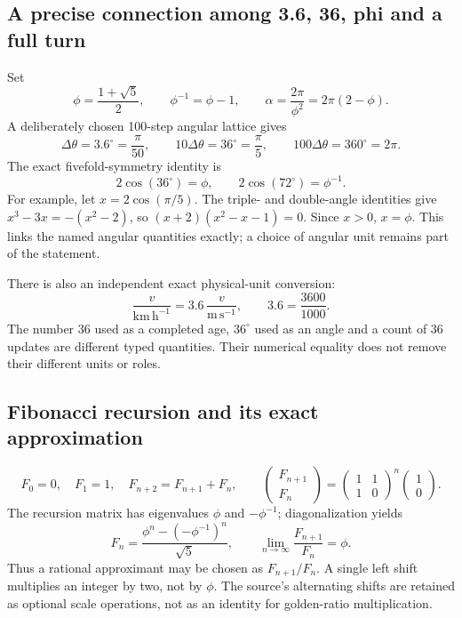 \documentclass[11pt,a4paper]{article}
\numberwithin{equation}{section}
\begin{document}
\subsection{A precise connection among 3.6, 36, phi and a full turn}
Set
\begin{equation}
\phi=\frac{1+\sqrt5}{2},\qquad \phi^{-1}=\phi-1,\qquad
\alpha=\frac{2\pi}{\phi^2}=2\pi(2-\phi).
\label{eq:phi}
\end{equation}
A deliberately chosen 100-step angular lattice gives
\begin{equation}
\Delta\theta=3.6^\circ=\frac{\pi}{50},\qquad
10\Delta\theta=36^\circ=\frac{\pi}{5},\qquad
100\Delta\theta=360^\circ=2\pi.
\end{equation}
The exact fivefold-symmetry identity is
\begin{equation}
2\cos(36^\circ)=\phi,\qquad 2\cos(72^\circ)=\phi^{-1}.
\end{equation}
For example, let $x=2\cos(\pi/5)$. The triple- and double-angle identities give
$x^3-3x=-(x^2-2)$, so $(x+2)(x^2-x-1)=0$. Since $x>0$, $x=\phi$. This links the named angular quantities exactly; a choice of angular unit remains part of the statement.

There is also an independent exact physical-unit conversion:
\begin{equation}
\frac{v}{\mathrm{km\,h^{-1}}}=3.6\,\frac{v}{\mathrm{m\,s^{-1}}},
\qquad 3.6=\frac{3600}{1000}.
\end{equation}
The number $36$ used as a completed age, $36^\circ$ used as an angle and a count of 36 updates are different typed quantities. Their numerical equality does not remove their different units or roles.

\subsection{Fibonacci recursion and its exact approximation}
\begin{equation}
F_0=0,\quad F_1=1,\quad F_{n+2}=F_{n+1}+F_n,\qquad
\begin{pmatrix}F_{n+1}\\F_n\end{pmatrix}
=\begin{pmatrix}1&1\\1&0\end{pmatrix}^{n}\begin{pmatrix}1\\0\end{pmatrix}.
\end{equation}
The recursion matrix has eigenvalues $\phi$ and $-\phi^{-1}$; diagonalization yields
\begin{equation}
F_n=\frac{\phi^n-(-\phi^{-1})^n}{\sqrt5},\qquad
\lim_{n\to\infty}\frac{F_{n+1}}{F_n}=\phi.
\end{equation}
Thus a rational approximant may be chosen as $F_{n+1}/F_n$. A single left shift multiplies an integer by two, not by $\phi$. The source's alternating shifts are retained as optional scale operations, not as an identity for golden-ratio multiplication.
\end{document}
